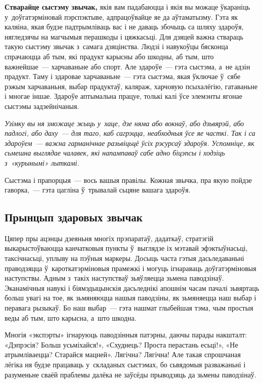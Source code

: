 \textbf{Стварайце сыстэму звычак,} якія вам падабаюцца і якія вы можаце ўкараніць у~доўгатэрміновай пэрспэктыве, адпрацоўвайце яе да аўтаматызму. Гэта як каляіна, якая будзе падтрымліваць вас і не даваць збочыць са шляху здароўя, нягледзячы на магчымыя перашкоды і цяжкасьці. Для дзяцей важна ствараць такую сыстэму звычак з~самага дзяцінства. Людзі і навукоўцы бясконца спрачаюцца аб тым, які прадукт карысны або шкодны, аб тым, што важнейшае~--- харчаваньне або спорт. Але здароўе~--- гэта сыстэма, а~не адзін прадукт. Таму і здаровае харчаваньне~--- гэта сыстэма, якая ўключае ў~сябе рэжым харчаваньня, выбар прадуктаў, каляраж, харчовую псыхалёгію, гатаваньне і многае іншае. Здароўе аптымальна працуе, толькі калі ўсе элемэнты ягонае сыстэмы задзейнічаныя.

\emph{Узімку вы ня зможаце жыць у~хаце, дзе няма або вокнаў, або дзьвярэй, або падлогі, або даху~--- для таго, каб сагрэцца, неабходныя ўсе яе часткі. Так і са здароўем~--- важна гарманічнае разьвіцьцё ўсіх рэсурсаў здароўя. Успомніце, як сьмешна выглядае чалавек, які напампаваў сабе адно біцэпсы і ходзіць з~«курынымі» лыткамі.}

Сыстэма і прапорцыя~--- вось вашыя правілы. Кожная звычка, пра якую пойдзе гаворка,~--- гэта цагліна ў~трывалай сьцяне вашага здароўя.

\subsection*{Прынцып здаровых звычак}

Цяпер пры ацэнцы дзеяньня многіх прэпаратаў, дадаткаў, стратэгій выкарыстоўваюцца канчатковыя пункты ў~выглядзе іх мэтавай эфэктыўнасьці, таксічнасьці, уплыву на пэўныя маркеры. Досыць часта гэтыя дасьледаваньні праводзяцца ў~кароткатэрміновыя прамежкі і могуць ігнараваць доўгатэрміновыя наступствы. Адным з~такіх наступстваў зьяўляецца зьмена паводзінаў. Эканамічныя навукі і біямэдыцынскія дасьледнікі апошнім часам пачалі зьвяртаць больш увагі на тое, як зьмяняюцца нашыя паводзіны, як зьмяняецца наш выбар і перавага рызыкаў. Бо наш выбар~--- гэта нашмат глыбейшая тэма, чым простыя веды аб тым, што карысна, а~што шкодна.

Многія «экспэрты» ігнаруюць паводзінныя патэрны, даючы парады накшталт: «Дэпрэсія? Больш усьміхайся!», «Схуднець? Проста перастань есьці!», «Не атрымліваецца? Старайся мацней». Лягічна? Лягічна! Але такая спрошчаная лёгіка ня будзе працаваць у~складаных сыстэмах, бо сьвядомыя разважаньні і разуменьне сваёй праблемы далёка не заўсёды прыводзяць да зьмены паводзінаў.

